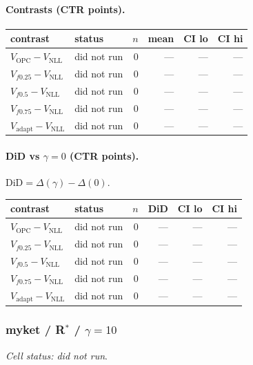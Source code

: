 \documentclass[10pt,a4paper]{article}
\begin{document}
\paragraph{Contrasts (CTR points).}
{\centering\small\begin{tabular}{llrrrr}
\toprule contrast & status & $n$ & mean & CI lo & CI hi \\
\midrule
$V_{\mathrm{OPC}}-V_{\mathrm{NLL}}$ & did not run & 0 & --- & --- & --- \\
$V_{f0.25}-V_{\mathrm{NLL}}$ & did not run & 0 & --- & --- & --- \\
$V_{f0.5}-V_{\mathrm{NLL}}$ & did not run & 0 & --- & --- & --- \\
$V_{f0.75}-V_{\mathrm{NLL}}$ & did not run & 0 & --- & --- & --- \\
$V_{\mathrm{adapt}}-V_{\mathrm{NLL}}$ & did not run & 0 & --- & --- & --- \\
\bottomrule\end{tabular}\par}
\paragraph{DiD vs $\gamma=0$ (CTR points).} $\mathrm{DiD}=\Delta(\gamma)-\Delta(0)$.
{\centering\small\begin{tabular}{llrrrr}
\toprule contrast & status & $n$ & DiD & CI lo & CI hi \\
\midrule
$V_{\mathrm{OPC}}-V_{\mathrm{NLL}}$ & did not run & 0 & --- & --- & --- \\
$V_{f0.25}-V_{\mathrm{NLL}}$ & did not run & 0 & --- & --- & --- \\
$V_{f0.5}-V_{\mathrm{NLL}}$ & did not run & 0 & --- & --- & --- \\
$V_{f0.75}-V_{\mathrm{NLL}}$ & did not run & 0 & --- & --- & --- \\
$V_{\mathrm{adapt}}-V_{\mathrm{NLL}}$ & did not run & 0 & --- & --- & --- \\
\bottomrule\end{tabular}\par}
\bigskip
\subsubsection{myket / R$^*$ / $\gamma=10$}
\emph{Cell status: did not run}.
\end{document}
